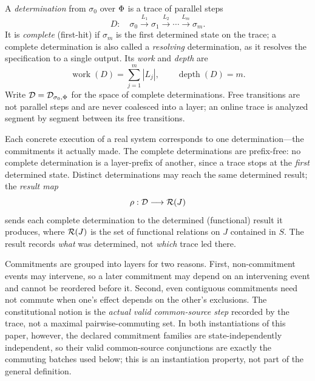 \begin{definition}
  \label{def:determination}
  A \emph{determination} from $\sigma_0$ over $\Phi$ is a trace of parallel
  steps
  \[
    D:\quad
    \sigma_0 \xrightarrow{L_1} \sigma_1 \xrightarrow{L_2} \cdots
    \xrightarrow{L_m} \sigma_m .
  \]
  It is \emph{complete} (first-hit) if $\sigma_m$ is the first determined
  state on the trace; a complete determination is also called a
  \emph{resolving} determination, as it resolves the specification to a
  single output. Its \emph{work} and \emph{depth} are
  \[
    \operatorname{work}(D) = \sum_{j=1}^{m} |L_j|,
    \qquad
    \operatorname{depth}(D) = m .
  \]
  Write $\mathcal{D} = \mathcal{D}_{\sigma_0,\Phi}$ for the space of complete
  determinations. Free transitions are not parallel steps and are never
  coalesced into a layer; an online trace is analyzed segment by segment
  between its free transitions.
\end{definition}

\noindent
Each concrete execution of a real system corresponds to one determination---the
commitments it actually made. The complete determinations are prefix-free:
no complete determination is a layer-prefix of another, since a trace stops at
the \emph{first} determined state. Distinct determinations may reach the same
determined result; the \emph{result map}
\[
  \rho : \mathcal{D} \longrightarrow \mathcal{R}(J)
\]
sends each complete determination to the determined (functional) result it
produces, where $\mathcal{R}(J)$ is the set of functional relations on $J$ contained
in $S$. The result records \emph{what} was determined, not \emph{which} trace
led there.

\begin{remark}
  \label{rem:layers}
  Commitments are grouped into layers for two reasons. First, non-commitment
  events may intervene, so a later commitment may depend on an intervening
  event and cannot be reordered before it. Second, even contiguous commitments
  need not commute when one's effect depends on the other's exclusions. The
  constitutional notion is the \emph{actual valid common-source step} recorded
  by the trace, not a maximal pairwise-commuting set. In both instantiations of
  this paper, however, the declared commitment families are
  state-independently independent, so their valid common-source conjunctions
  are exactly the commuting batches used below; this is an instantiation
  property, not part of the general definition.
\end{remark}
